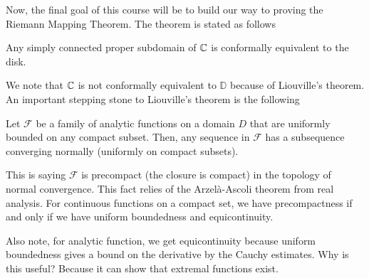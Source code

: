 \documentclass[11pt,leqno,oneside]{amsart}
\numberwithin{thm}{section}
\newcommand{\D}{\mathbb{D}}
\begin{document}
  Now, the final goal of this course will be to build our way to
  proving the Riemann Mapping Theorem. The theorem is stated as
  follows
  \begin{thm}
    Any simply connected proper subdomain of ${\mathbb C}$ is conformally
    equivalent to the disk.
  \end{thm}
  We note that ${\mathbb C}$ is not conformally equivalent to $\D$ because of
  Liouville's theorem. An important stepping stone to Liouville's
  theorem is the following
  \begin{thm}
    Let $\mathcal{F}$ be a family of analytic functions on a domain
    $D$ that are uniformly bounded on any compact subset. Then, any
    sequence in $\mathcal{F}$ has a subsequence converging normally
    (uniformly on compact subsets).
  \end{thm}
  \begin{rmk}
    This is saying $\mathcal{F}$ is precompact (the closure is
    compact) in the topology of normal convergence. This fact relies
    of the Arzel\`{a}-Ascoli theorem from real analysis. For
    continuous functions on a compact set, we have precompactness if
    and only if we have uniform boundedness and equicontinuity.
  \end{rmk}
  Also note, for analytic function, we get equicontinuity because
  uniform boundedness gives a bound on the derivative by the Cauchy
  estimates. Why is this useful? Because it can show that extremal
  functions exist.
\end{document}
